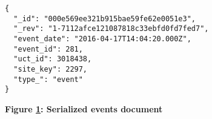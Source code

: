 \begin{figure}[H]
  \centering
  \begin{mdframed}
    \centering
    \begin{verbatim}
{
  "_id": "000e569ee321b915bae59fe62e0051e3",
  "_rev": "1-7112afce121087818c33ebfd0fd7fed7",
  "event_date": "2016-04-17T14:04:20.000Z",
  "event_id": 281,
  "uct_id": 3018438,
  "site_key": 2297,
  "type_": "event"
}           
        \end{verbatim}
  \end{mdframed}
  \caption[Serialized events document]{\textbf{Figure \ref{fig-json-event}: Serialized events document}}
  \label{fig-json-event}
\end{figure}
